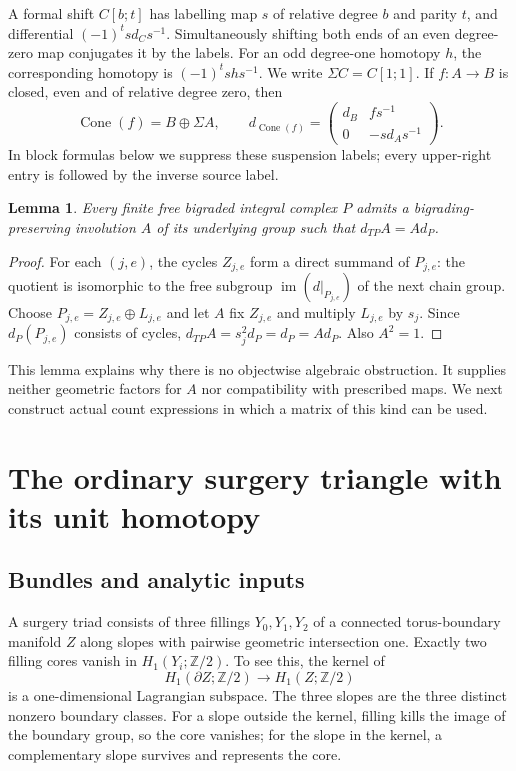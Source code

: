 \documentclass[11pt]{amsart}
\newtheorem{lemma}[theorem]{Lemma}
\theoremstyle{definition}
\theoremstyle{remark}
\theoremstyle{plain}
\newcommand{\ZZ}{\mathbb Z}
\newcommand{\Cone}{\operatorname{Cone}}
\begin{document}
A formal shift $C[b;t]$ has labelling map $s$ of relative degree
$b$ and parity $t$, and differential $(-1)^tsd_Cs^{-1}$.
Simultaneously shifting both ends of an even degree-zero map
conjugates it by the labels. For an odd degree-one homotopy $h$,
the corresponding homotopy is $(-1)^tshs^{-1}$. We write
$\Sigma C=C[1;1]$. If $f:A\to B$ is closed, even and of relative
degree zero, then
\begin{equation}\label{eq:cone-convention}
 \Cone(f)=B\oplus\Sigma A,\qquad
 d_{\Cone(f)}=
 \begin{pmatrix}d_B&f s^{-1}\\0&-sd_As^{-1}\end{pmatrix}.
\end{equation}
In block formulas below we suppress these suspension labels;
every upper-right entry is followed by the inverse source label.

\begin{lemma}\label{lem:algebraic-normalizer}
Every finite free bigraded integral complex $P$ admits a
bigrading-preserving involution $A$ of its underlying group such
that $d_{TP}A=Ad_P$.
\end{lemma}
\begin{proof}
For each $(j,e)$, the cycles $Z_{j,e}$ form a direct summand of
$P_{j,e}$: the quotient is isomorphic to the free subgroup
$\operatorname{im}(d|_{P_{j,e}})$ of the next chain group.
Choose $P_{j,e}=Z_{j,e}\oplus L_{j,e}$ and let $A$ fix $Z_{j,e}$
and multiply $L_{j,e}$ by $s_j$. Since $d_P(P_{j,e})$ consists
of cycles, $d_{TP}A=s_j^2d_P=d_P=Ad_P$. Also $A^2=1$.
\end{proof}

This lemma explains why there is no objectwise algebraic
obstruction. It supplies neither geometric factors for $A$ nor
compatibility with prescribed maps. We next construct actual
count expressions in which a matrix of this kind can be used.

\section{The ordinary surgery triangle with its unit homotopy}
\label{sec:surgery}

\subsection{Bundles and analytic inputs}\label{sec:surgery-inputs}
A surgery triad consists of three fillings $Y_0,Y_1,Y_2$ of a
connected torus-boundary manifold $Z$ along slopes with pairwise
geometric intersection one. Exactly two filling cores vanish in
$H_1(Y_i;\ZZ/2)$. To see this, the kernel of
\[
 H_1(\partial Z;\ZZ/2)\longrightarrow H_1(Z;\ZZ/2)
\]
is a one-dimensional Lagrangian subspace. The three slopes are
the three distinct nonzero boundary classes. For a slope outside
the kernel, filling kills the image of the boundary group, so
the core vanishes; for the slope in the kernel, a complementary
slope survives and represents the core.
\end{document}
